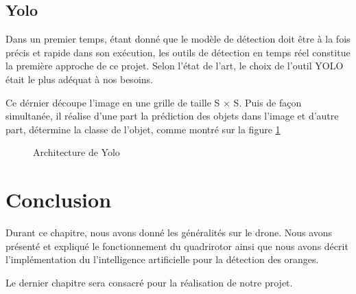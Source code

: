 \subsection{Yolo}
Dans un premier temps, étant donné que le modèle de détection doit être à la fois précis et rapide dans son exécution, les outils de détection en temps réel constitue la première approche de ce projet. Selon l’état de l’art, le choix de l’outil YOLO était le plus adéquat à nos besoins. 

Ce dérnier découpe l’image en une grille de taille S × S. Puis de façon simultanée, il réalise d’une part la prédiction des objets dans l’image et d’autre part, détermine la classe de l’objet\cite{towardsdatascience.}, comme montré sur la figure \ref{fig:A.Y}
\begin{figure} [H]
	\begin{center}
		\caption{\label{fig:A.Y}Architecture de Yolo}
	\end{center}
\end{figure}
\section*{Conclusion}
Durant ce chapitre, nous avons donné les 
généralités sur le drone. Nous avons présenté et expliqué le fonctionnement du quadrirotor ainsi que nous avons décrit l'implémentation du l'intelligence artificielle pour la détection des oranges.

Le dernier chapitre sera consacré pour la réalisation de notre projet.
